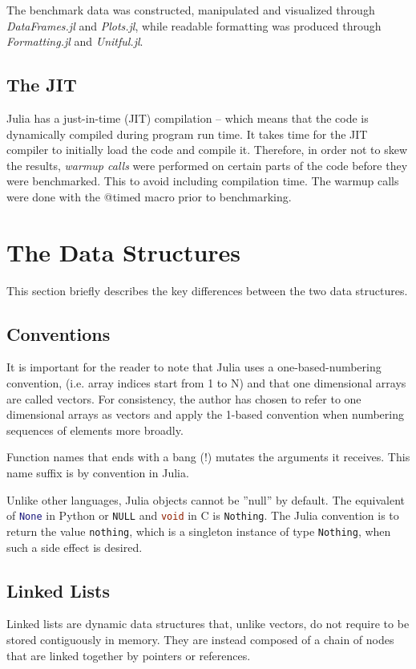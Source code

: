 \documentclass[a4paper, 11pt]{article}
\begin{document}
    The benchmark data was constructed, manipulated and visualized through
    \emph{DataFrames.jl} and \emph{Plots.jl}, while 
    readable formatting was produced through \emph{Formatting.jl} and \emph{Unitful.jl}. 

    \subsection*{The JIT}
    Julia has a just-in-time (JIT) compilation -- which means that the code is
    dynamically compiled during program run time.     
    It takes time for the JIT compiler to 
    initially load the code and compile it. Therefore, in order not to skew the
    results, \emph{warmup calls} were performed on certain parts of the code
    before they were benchmarked. This to avoid including 
    compilation time. The warmup calls were done with the @timed macro prior to
    benchmarking.

    \section*{The Data Structures}
    This section briefly describes the key differences between the two data
    structures. 
    
    \subsection*{Conventions}
    It is important for the reader to note that Julia uses a one-based-numbering
    convention, (i.e. array indices start from 1 to N) and that one dimensional
    arrays are called vectors. 
    For consistency, the author has chosen to refer to one dimensional
    arrays as vectors and apply the 1-based convention when numbering
    sequences of elements more broadly. 

    Function names that ends with a bang (!) mutates the arguments it receives. 
    This name suffix is by convention in Julia. 
    
    Unlike other languages, Julia objects cannot be ''null'' by default. The
    equivalent of \lstinline[language=Python]{None} in Python 
    or \lstinline[language=C]{NULL} and \lstinline[language=C]{void} in C is
    \texttt{Nothing}. The Julia convention is to return the value \texttt{nothing}, which is a
    singleton instance of type \texttt{Nothing}, when such a side effect is
    desired. 

    \subsection*{Linked Lists}
    Linked lists are dynamic data structures that, unlike vectors, do not require
    to be stored contiguously in memory. They are instead composed of a chain of 
    nodes that are linked together by pointers or references. 
    
\end{document}
